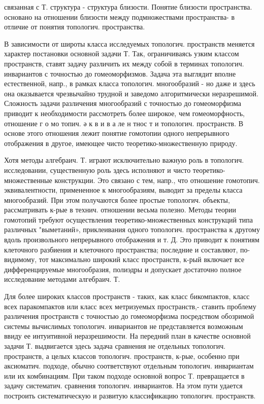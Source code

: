 \documentclass[10pt]{article}
\begin{document}
связанная с Т. структура - структура близости. Понятие близости пространства. основано на отношении близости между подмножествами пространства- в отличие от понятия топологич. пространства.



В зависимости от широты класса исследуемых топологич. пространств меняется характер постановки основной задачи Т. Так, ограничиваясь узким классом пространств, ставят задачу различить их между собой в терминах топологич. инвариантов с точностью до гомеоморфизмов. Задача эта выглядит вполне естественной, напр., в рамках класса топологич. многообразий - но даже и здесь она оказывается чрезвычайно трудной и заведомо алгоритмически неразрешимой. Сложность задачи различения многообразий с точностью до гомеоморфизма приводит к необходимости рассмотреть более широкое, чем гомеоморфность, отношение г о мо топич. ә к в и в а ле н тнос т и топологич. пространств. В основе этого отношения лежит понятие гомотопии одного непрерывного отображения в другое, имеющее чисто теоретико-множественную природу.



Хотя методы алгебраич. Т. играют исключительно важную роль в топологич. исследовании, существенную роль здесь исполняют и чисто теоретико-множественные конструкции. Это связано с тем, напр., что отношение гомотопич. эквивалентности, примененное к многообразиям, выводит за пределы класса многообразий. При этом получаются более простые топологич. объекты, рассматривать к-рые в технич. отношении весьма полезно. Методы теории гомотопий требуют осуществления теоретико-множественных конструкций типа различных "выметаний», приклеивания одного топологич. пространства к другому вдоль произвольного непрерывного отображения и т. Д. Это приводит к понятиям клеточного разбиения и клеточного пространства; последние и составляют, по-видимому, тот максимально широкий класс пространств, к-рый включает все дифференцируемые многообразия, полиэдры и допускает достаточно полное исследование методами алгебраич. Т.



Для более широких классов пространств - таких, как класс бикомпактов, класс всех паракомпактов или класс всех метризуемых пространств,- ставить проблему различения пространств с точностью до гомеоморфизма посредством обозримой системы вычислимых топологич. инвариантов не представляется возможным ввиду ее интуитивной неразрешимости. На передний план в качестве основной задачи Т. выдвигается здесь задача сравнения не отдельных топологич. пространств, а целых классов топологич. пространств, к-рые, особенно при аксиоматич. подходе, обычно соответствуют отдельным топологич. инвариантам или их комбинациям. При таком подходе основной вопрос Т. превращается в задачу систематич. сравнения топологич. инвариантов. На этом пути удается построить систематическую и развитую классификацию топологич. пространств.
\end{document}

